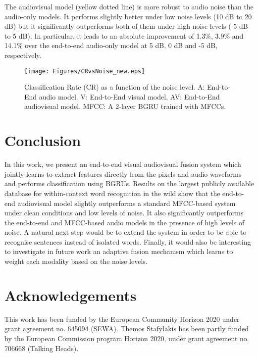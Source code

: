 \documentclass{article}
\begin{document}
The audiovisual model (yellow dotted line) 
is more robust to audio noise than the audio-only models. It performs slightly better under low noise levels (10 dB to 20 dB) but it significantly outperforms both of them under high noise levels (-5 dB to 5 dB). In particular, it leads to an absolute improvement of 1.3\%, 3.9\% and 14.1\% over the end-to-end audio-only model at 5 dB, 0 dB and -5 dB, respectively.  






\begin{figure}[t]


  \centering
\texttt{[image: Figures/CRvsNoise\_new.eps]}



\caption{ Classification Rate (CR) as a function of the noise level. A: End-to-End audio model. V: End-to-End visual model, AV: End-to-End audiovisual model. MFCC: A 2-layer BGRU trained with MFCCs.}
\label{fig:CRvsNoise}
\end{figure}



\section{Conclusion}
In this work, we present an end-to-end visual audiovisual fusion system which 
jointly learns to extract features directly from the pixels and audio waveforms and performs classification using BGRUs. Results on the largest publicly available database for within-context word recognition in the wild show that the end-to-end audiovisual model slightly outperforms a standard MFCC-based system under clean conditions and low levels of noise. It also significantly outperforms the end-to-end and MFCC-based audio models in the presence of high levels of noise. A natural next step would be to extend the system in order to be able to recognise sentences instead of isolated words. Finally, it would also be interesting to investigate in future work an adaptive fusion mechanism which learns to weight each modality based on the noise levels.

\section{Acknowledgements}
This work has been funded by the European Community Horizon 2020 under grant agreement
no. 645094 (SEWA). Themos Stafylakis has been partly funded by the European Commission program Horizon 2020, under grant agreement no. 706668 (Talking Heads). 


















\end{document}
